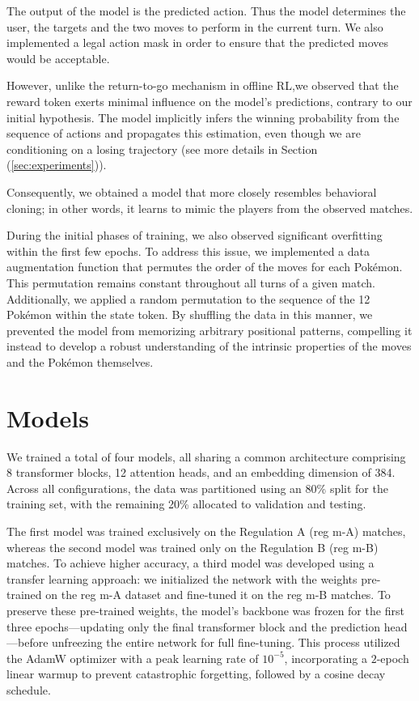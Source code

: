\documentclass{article}
\begin{document}
The output of the model is the predicted action. Thus the model determines the user, the targets and the two moves to perform in the current turn. We also implemented a legal action mask  in order to ensure that the predicted moves would be acceptable.

However, unlike the return-to-go mechanism in offline RL,we observed that the reward token exerts minimal influence on the model's predictions, contrary to our initial hypothesis. The model implicitly infers the winning probability from the sequence of actions and propagates this estimation, even though we are conditioning on a losing trajectory (see more details in Section (\ref{sec:experiments})). 

Consequently, we obtained a model that more closely resembles behavioral cloning; in other words, it learns to mimic the players from the observed matches. 

During the initial phases of training, we also observed significant overfitting within the first few epochs. To address this issue, we implemented a data augmentation function that permutes the order of the moves for each Pokémon. This permutation remains constant throughout all turns of a given match. Additionally, we applied a random permutation to the sequence of the 12 Pokémon within the state token. By shuffling the data in this manner, we prevented the model from memorizing arbitrary positional patterns, compelling it instead to develop a robust understanding of the intrinsic properties of the moves and the Pokémon themselves.
\section{Models}
We trained a total of four models, all sharing a common architecture comprising 8 transformer blocks, 12 attention heads, and an embedding dimension of 384. Across all configurations, the data was partitioned using an 80\% split for the training set, with the remaining 20\% allocated to validation and testing.


The first model was trained exclusively on the Regulation A (reg m-A) matches, whereas the second model was trained only on the Regulation B (reg m-B) matches. To achieve higher accuracy, a third model was developed using a transfer learning approach: we initialized the network with the weights pre-trained on the reg m-A dataset and fine-tuned it on the reg m-B matches. To preserve these pre-trained weights, the model's backbone was frozen for the first three epochs—updating only the final transformer block and the prediction head—before unfreezing the entire network for full fine-tuning. This process utilized the AdamW optimizer with a peak learning rate of $10^{-5}$, incorporating a $2$-epoch linear warmup to prevent catastrophic forgetting, followed by a cosine decay schedule.
\end{document}
